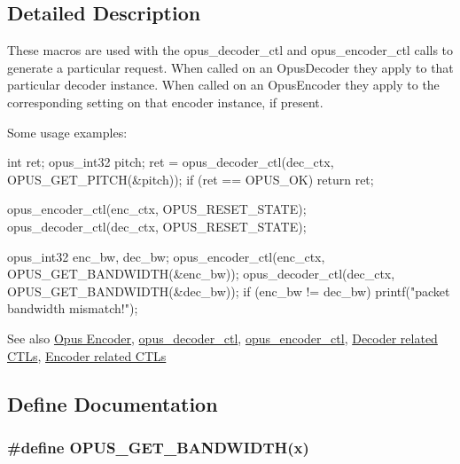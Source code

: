 \subsection{Detailed Description}
These macros are used with the {\ttfamily opus\_\-decoder\_\-ctl} and {\ttfamily opus\_\-encoder\_\-ctl} calls to generate a particular request. When called on an {\ttfamily OpusDecoder} they apply to that particular decoder instance. When called on an {\ttfamily OpusEncoder} they apply to the corresponding setting on that encoder instance, if present.

Some usage examples:


\begin{DoxyCode}
 int ret;
 opus_int32 pitch;
 ret = opus_decoder_ctl(dec_ctx, OPUS_GET_PITCH(&pitch));
 if (ret == OPUS_OK) return ret;

 opus_encoder_ctl(enc_ctx, OPUS_RESET_STATE);
 opus_decoder_ctl(dec_ctx, OPUS_RESET_STATE);

 opus_int32 enc_bw, dec_bw;
 opus_encoder_ctl(enc_ctx, OPUS_GET_BANDWIDTH(&enc_bw));
 opus_decoder_ctl(dec_ctx, OPUS_GET_BANDWIDTH(&dec_bw));
 if (enc_bw != dec_bw) {
   printf("packet bandwidth mismatch!\n");
 }
\end{DoxyCode}


\begin{DoxySeeAlso}{See also}
\hyperlink{group__opus__encoder}{Opus Encoder}, \hyperlink{group__opus__decoder_ga2d492844b4f66e7f34d85870f13d4846}{opus\_\-decoder\_\-ctl}, \hyperlink{group__opus__encoder_ga164cbb0425238961919adf1db67949df}{opus\_\-encoder\_\-ctl}, \hyperlink{group__opus__decoderctls}{Decoder related CTLs}, \hyperlink{group__opus__encoderctls}{Encoder related CTLs} 
\end{DoxySeeAlso}


\subsection{Define Documentation}
\hypertarget{group__opus__genericctls_ga29db1d9b5e670debec54d1163ad2ec62}{
\subsubsection[{OPUS\_\-GET\_\-BANDWIDTH}]{\setlength{\rightskip}{0pt plus 5cm}\#define OPUS\_\-GET\_\-BANDWIDTH(x)}}
\label{group__opus__genericctls_ga29db1d9b5e670debec54d1163ad2ec62}


